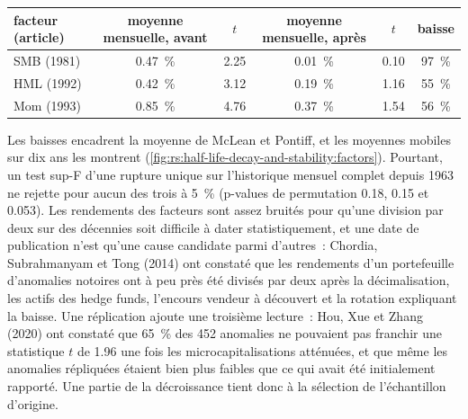 \begin{center}
\small
\begin{tabular}{@{}lccccc@{}}
\toprule
facteur (article) & moyenne mensuelle, avant & $t$ & moyenne mensuelle, après & $t$ & baisse\\
\midrule
SMB (1981) & 0.47~\% & 2.25 & 0.01~\% & 0.10 & 97~\%\\
HML (1992) & 0.42~\% & 3.12 & 0.19~\% & 1.16 & 55~\%\\
Mom (1993) & 0.85~\% & 4.76 & 0.37~\% & 1.54 & 56~\%\\
\bottomrule
\end{tabular}
\end{center}

Les baisses encadrent la moyenne de McLean et Pontiff, et les moyennes mobiles sur dix ans les montrent
(\cref{fig:rs:half-life-decay-and-stability:factors}). Pourtant, un test sup-F d'une rupture unique sur l'historique mensuel complet depuis 1963 ne rejette pour
aucun des trois à 5~\% (p-values de permutation 0.18, 0.15 et 0.053). Les rendements des facteurs sont assez bruités pour qu'une division par deux sur des décennies soit difficile
à dater statistiquement, et une date de publication n'est qu'une cause candidate parmi d'autres~: Chordia, Subrahmanyam et Tong (2014) ont constaté que les
rendements d'un portefeuille d'anomalies notoires ont à peu près été divisés par deux après la décimalisation, les actifs des hedge funds, l'encours vendeur à découvert
et la rotation expliquant la baisse. Une réplication ajoute une troisième lecture~: Hou, Xue et Zhang (2020) ont constaté que 65~\% des 452 anomalies ne pouvaient pas franchir une statistique $t$
de 1.96 une fois les microcapitalisations atténuées, et que même les anomalies répliquées étaient bien plus faibles que ce qui avait été initialement rapporté. Une partie de la
décroissance tient donc à la sélection de l'échantillon d'origine.

